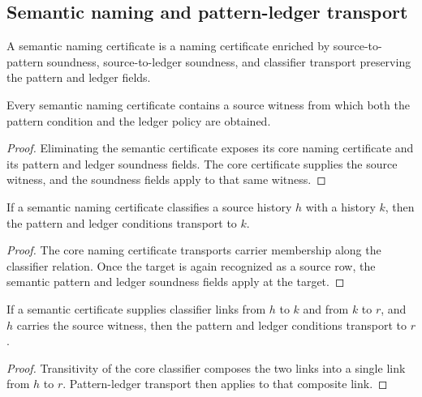 \subsection{Semantic naming and pattern-ledger transport}
\label{subsec:philosophy-semantic-namecert-transport}

\begin{definition}
\label{def:philosophy-semantic-namecert}
A semantic naming certificate is a naming certificate enriched by
source-to-pattern soundness, source-to-ledger soundness, and classifier
transport preserving the pattern and ledger fields.
\end{definition}

\begin{theorem}
\label{thm:philosophy-semantic-certificates-pattern-ledger-witnesses}
Every semantic naming certificate contains a source witness from which
both the pattern condition and the ledger policy are obtained.
\end{theorem}
\begin{proof}
Eliminating the semantic certificate exposes its core naming
certificate and its pattern and ledger soundness fields. The core
certificate supplies the source witness, and the soundness fields apply
to that same witness.
\end{proof}

\begin{theorem}
\label{thm:philosophy-pattern-ledger-transport}
If a semantic naming certificate classifies a source history \(h\) with
a history \(k\), then the pattern and ledger conditions transport to
\(k\).
\end{theorem}
\begin{proof}
The core naming certificate transports carrier membership along the
classifier relation. Once the target is again recognized as a source
row, the semantic pattern and ledger soundness fields apply at the
target.
\end{proof}

\begin{theorem}
\label{thm:philosophy-classifier-chain-transport}
If a semantic certificate supplies classifier links from \(h\) to \(k\)
and from \(k\) to \(r\), and \(h\) carries the source witness, then the
pattern and ledger conditions transport to \(r\).
\end{theorem}
\begin{proof}
Transitivity of the core classifier composes the two links into a
single link from \(h\) to \(r\). Pattern-ledger transport then applies
to that composite link.
\end{proof}

